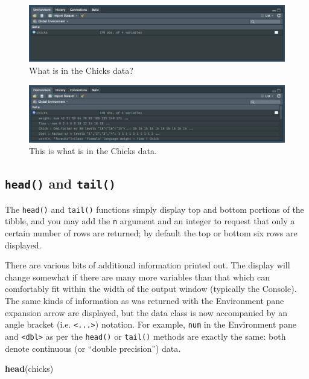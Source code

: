 \documentclass[english,10pt,a4paper,oneside]{book}
\newenvironment{Shaded}{\begin{snugshade}}{\end{snugshade}}
\newcommand{\KeywordTok}[1]{\textcolor[rgb]{0.13,0.29,0.53}{\textbf{#1}}}
\newcommand{\NormalTok}[1]{#1}
\theoremstyle{definition}
\theoremstyle{definition}
\theoremstyle{definition}
\theoremstyle{remark}
\begin{document}
\begin{figure}[h!]
\begin{center}
\includegraphics[width=0.7\linewidth]{figures/chicks_1}
\end{center}
\caption{What is in the Chicks data?}
\end{figure}

\begin{figure}[h!]
\begin{center}
\includegraphics[width=0.7\linewidth]{figures/chicks_2}
\end{center}
\caption{This is what is in the Chicks data.}
\end{figure}

\subsection{\texorpdfstring{\texttt{head()} and
\texttt{tail()}}{head() and tail()}}\label{head-and-tail}

The \texttt{head()} and \texttt{tail()} functions simply display top and
bottom portions of the tibble, and you may add the \texttt{n} argument
and an integer to request that only a certain number of rows are
returned; by default the top or bottom six rows are displayed.

There are various bits of additional information printed out. The
display will change somewhat if there are many more variables than that
which can comfortably fit within the width of the output window
(typically the Console). The same kinds of information as was returned
with the Environment pane expansion arrow are displayed, but the data
class is now accompanied by an angle bracket (i.e.
\texttt{\textless{}...\textgreater{}}) notation. For example,
\texttt{num} in the Environment pane and
\texttt{\textless{}dbl\textgreater{}} as per the \texttt{head()} or
\texttt{tail()} methods are exactly the same: both denote continuous (or
\enquote{double precision}) data.

\begin{Shaded}
\begin{Highlighting}[]
\KeywordTok{head}\NormalTok{(chicks)}
\end{Highlighting}
\end{Shaded}
\end{document}
